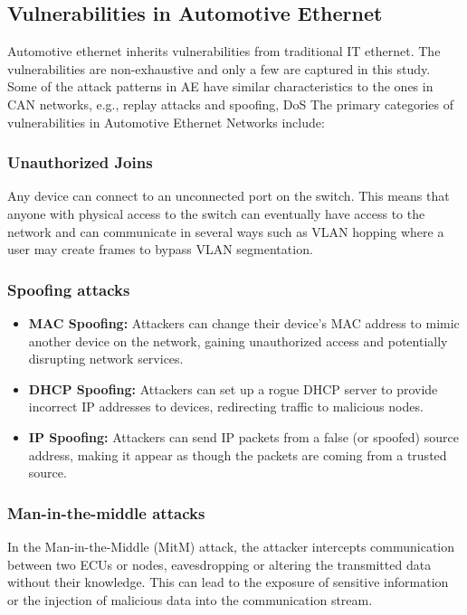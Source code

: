 \documentclass{report}
\begin{document}
\subsection{Vulnerabilities in Automotive Ethernet}
Automotive ethernet inherits vulnerabilities from traditional IT ethernet. The vulnerabilities are non-exhaustive and only a few are captured in this study. Some of the attack patterns in AE have similar characteristics to the ones in CAN networks, e.g., replay attacks and spoofing, DoS
The primary categories of vulnerabilities in Automotive Ethernet Networks include:
\subsubsection{Unauthorized Joins}
Any device can connect to an unconnected port on the switch. This means that anyone with physical access to the switch can eventually have access to the network and can communicate in several ways such as VLAN hopping where a user may create frames to bypass VLAN segmentation.

\subsubsection{Spoofing attacks}
\begin{itemize}
    \item \textbf{MAC Spoofing:} Attackers can change their device’s MAC address to mimic another device on the network, gaining unauthorized access and potentially disrupting network services.
    \item \textbf{DHCP Spoofing:} Attackers can set up a rogue DHCP server to provide incorrect IP addresses to devices, redirecting traffic to malicious nodes.
    \item \textbf{IP Spoofing:} Attackers can send IP packets from a false (or spoofed) source address, making it appear as though the packets are coming from a trusted source.
\end{itemize}

\subsubsection{Man-in-the-middle attacks}
In the Man-in-the-Middle (MitM) attack, the attacker intercepts communication between two ECUs or nodes, eavesdropping or altering the transmitted data without their knowledge. This can lead to the exposure of sensitive information or the injection of malicious data into the communication stream.
\end{document}
